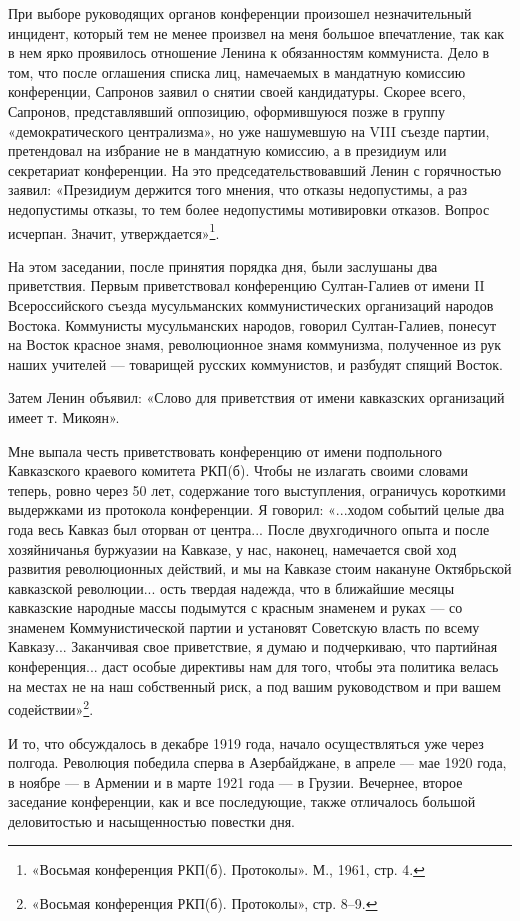 \documentclass[12pt, a4paper, openany]{book}
\begin{document}
При выборе руководящих органов конференции произошел незначительный инцидент, который тем не менее произвел на меня большое впечатление, так как в нем ярко проявилось отношение Ленина к обязанностям коммуниста. Дело в том, что после оглашения списка лиц, намечаемых в мандатную комиссию конференции, Сапронов заявил о снятии своей кандидатуры. Скорее всего, Сапронов, представлявший оппозицию, оформившуюся позже в группу «демократического централизма», но уже нашумевшую на VIII съезде партии, претендовал на избрание не в мандатную комиссию, а в президиум или секретариат конференции. На это председательствовавший Ленин с горячностью заявил: «Президиум держится того мнения, что отказы недопустимы, а раз недопустимы отказы, то тем более недопустимы мотивировки отказов. Вопрос исчерпан. Значит, утверждается»\footnote{«Восьмая конференция РКП(б). Протоколы». М., 1961, стр. 4.}.

На этом заседании, после принятия порядка дня, были заслушаны два приветствия. Первым приветствовал конференцию Султан-Галиев от имени II Всероссийского съезда мусульманских коммунистических организаций народов Востока. Коммунисты мусульманских народов, говорил Султан-Галиев, понесут на Восток красное знамя, революционное знамя коммунизма, полученное из рук наших учителей — товарищей русских коммунистов, и разбудят спящий Восток.

Затем Ленин объявил: «Слово для приветствия от имени кавказских организаций имеет т. Микоян».

Мне выпала честь приветствовать конференцию от имени подпольного Кавказского краевого комитета РКП(б). Чтобы не излагать своими словами теперь, ровно через 50 лет, содержание того выступления, ограничусь короткими выдержками из протокола конференции. Я говорил: «...ходом событий целые два года весь Кавказ был оторван от центра... После двухгодичного опыта и после хозяйничанья буржуазии на Кавказе, у нас, наконец, намечается свой ход развития революционных действий, и мы на Кавказе стоим накануне Октябрьской кавказской революции... ость твердая надежда, что в ближайшие месяцы кавказские народные массы подымутся с красным знаменем и руках — со знаменем Коммунистической партии и установят Советскую власть по всему Кавказу... Заканчивая свое приветствие, я думаю и подчеркиваю, что партийная конференция... даст особые директивы нам для того, чтобы эта политика велась на местах не на наш собственный риск, а под вашим руководством и при вашем содействии»\footnote{«Восьмая конференция РКП(б). Протоколы», стр. 8–9.}.

И то, что обсуждалось в декабре 1919 года, начало осуществляться уже через полгода. Революция победила сперва в Азербайджане, в апреле — мае 1920 года, в ноябре — в Армении и в марте 1921 года — в Грузии. Вечернее, второе заседание конференции, как и все последующие, также отличалось большой деловитостью и насыщенностью повестки дня.
\end{document}

